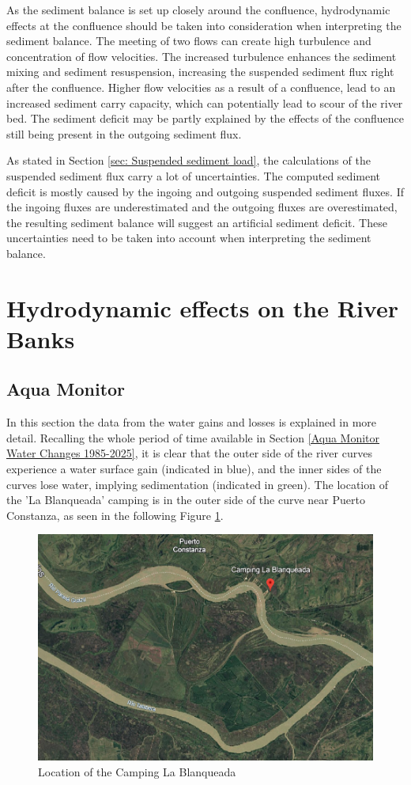 As the sediment balance is set up closely around the confluence, hydrodynamic effects at the confluence should be taken into consideration when interpreting the sediment balance. The meeting of two flows can create high turbulence and concentration of flow velocities. The increased turbulence enhances the sediment mixing and sediment resuspension, increasing the suspended sediment flux right after the confluence. Higher flow velocities as a result of a confluence, lead to an increased sediment carry capacity, which can potentially lead to scour of the river bed. The sediment deficit may be partly explained by the effects of the confluence still being present in the outgoing sediment flux.

As stated in Section \ref{sec: Suspended sediment load}, the calculations of the suspended sediment flux carry a lot of uncertainties. The computed sediment deficit is mostly caused by the ingoing and outgoing suspended sediment fluxes. If the ingoing fluxes are underestimated and the outgoing fluxes are overestimated, the resulting sediment balance will suggest an artificial sediment deficit. These uncertainties need to be taken into account when interpreting the sediment balance.


\section{Hydrodynamic effects on the River Banks}
\subsection{Aqua Monitor}
\label{section:cirtical_location}
In this section the data from the water gains and losses is explained in more detail.
Recalling the whole period of time available in Section \ref{Aqua Monitor Water Changes 1985-2025}, it is clear that the outer side of the river curves experience a water surface gain (indicated in blue), and the inner sides of the curves lose water, implying sedimentation (indicated in green). 
The location of the 'La Blanqueada' camping  is in the outer side of the curve near Puerto Constanza, as seen in the following Figure \ref{fig:Camping Blanqueada}.

\begin{figure}[H]
    \centering
    \includegraphics[width=0.5\linewidth]{figures/ch5/Camping Blanqueada.png}
    \caption{Location of the Camping La Blanqueada}
    \label{fig:Camping Blanqueada}
\end{figure}

